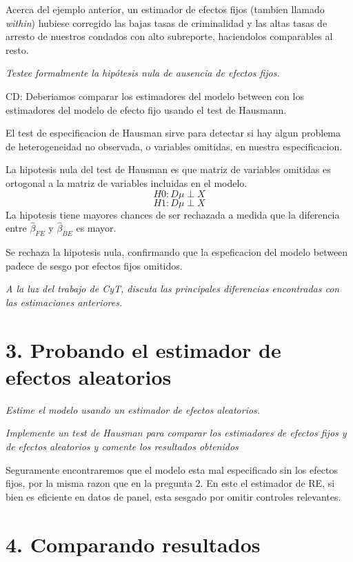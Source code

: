 \documentclass[
]{article}
\begin{document}
Acerca del ejemplo anterior, un estimador de efectos fijos (tambien
llamado \emph{within}) hubiese corregido las bajas tasas de criminalidad
y las altas tasas de arresto de nuestros condados con alto subreporte,
haciendolos comparables al resto.

\emph{Testee formalmente la hipótesis nula de ausencia de efectos fijos.
}

CD: Deberiamos comparar los estimadores del modelo between con los
estimadores del modelo de efecto fijo usando el test de Hausmann.

El test de especificacion de Hausman sirve para detectar si hay algun
problema de heterogeneidad no observada, o variables omitidas, en
nuestra especificacion.

La hipotesis nula del test de Hausman es que matriz de variables
omitidas es ortogonal a la matriz de variables incluidas en el modelo.
\[
H0: D\mu  \perp X
\] \[
H1: D\mu  \perp X
\] La hipotesis tiene mayores chances de ser rechazada a medida que la
diferencia entre \(\hat\beta_{FE}\) y \(\hat\beta_{BE}\) es mayor.

Se rechaza la hipotesis nula, confirmando que la espeficacion del modelo
between padece de sesgo por efectos fijos omitidos.

\emph{A la luz del trabajo de CyT, discuta las principales diferencias
encontradas con las estimaciones anteriores.}

\hypertarget{probando-el-estimador-de-efectos-aleatorios}{%
\section{3. Probando el estimador de efectos
aleatorios}\label{probando-el-estimador-de-efectos-aleatorios}}

\emph{Estime el modelo usando un estimador de efectos aleatorios. }

\emph{Implemente un test de Hausman para comparar los estimadores de
efectos fijos y de efectos aleatorios y comente los resultados
obtenidos}

Seguramente encontraremos que el modelo esta mal especificado sin los
efectos fijos, por la misma razon que en la pregunta 2. En este el
estimador de RE, si bien es eficiente en datos de panel, esta sesgado
por omitir controles relevantes.

\hypertarget{comparando-resultados}{%
\section{4. Comparando resultados}\label{comparando-resultados}}
\end{document}
